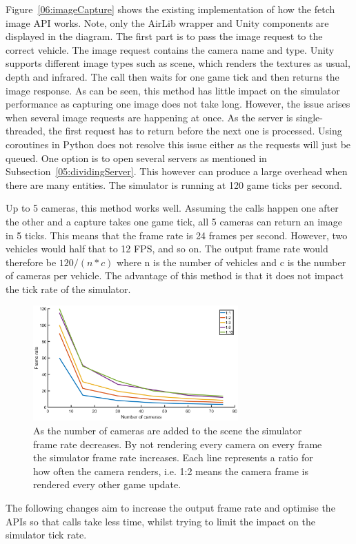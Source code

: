 Figure~\ref{06:imageCapture} shows the existing implementation of how the fetch image API works. Note, only the AirLib wrapper and Unity components are displayed in the diagram. The first part is to pass the image request to the correct vehicle. The image request contains the camera name and type. Unity supports different image types such as scene, which renders the textures as usual, depth and infrared. The call then waits for one game tick and then returns the image response. As can be seen, this method has little impact on the simulator performance as capturing one image does not take long. However, the issue arises when several image requests are happening at once. As the server is single-threaded, the first request has to return before the next one is processed. Using coroutines in Python does not resolve this issue either as the requests will just be queued. One option is to open several servers as mentioned in Subsection~\ref{05:dividingServer}. This however can produce a large overhead when there are many entities. The simulator is running at 120 game ticks per second.

Up to 5 cameras, this method works well. Assuming the calls happen one after the other and a capture takes one game tick, all 5 cameras can return an image in 5 ticks. This means that the frame rate is 24 frames per second. However, two vehicles would half that to 12 FPS, and so on. The output frame rate would therefore be $120/(n*c)$ where n is the number of vehicles and c is the number of cameras per vehicle. The advantage of this method is that it does not impact the tick rate of the simulator. 

\begin{figure}
    \includegraphics[width=0.7\textwidth]{06_Implementation/00_AirSim/Diagrams/frameRates.png}
    \caption{As the number of cameras are added to the scene the simulator frame rate decreases. By not rendering every camera on every frame the simulator frame rate increases. Each line represents a ratio for how often the camera renders, i.e. 1:2 means the camera frame is rendered every other game update.} \label{06:frameRates}
\end{figure}
The following changes aim to increase the output frame rate and optimise the APIs so that calls take less time, whilst trying to limit the impact on the simulator tick rate. 

